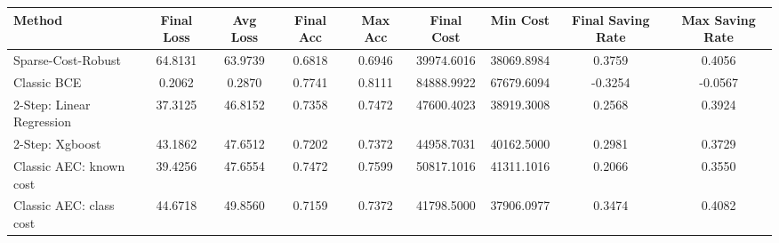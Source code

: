 \begin{tabular}{lcccccccc}
\toprule
Method & Final Loss & Avg Loss & Final Acc & Max Acc & Final Cost & Min Cost & Final Saving Rate & Max Saving Rate \\
\midrule
Sparse-Cost-Robust & 64.8131 & 63.9739 & 0.6818 & 0.6946 & 39974.6016 & 38069.8984 & 0.3759 & 0.4056 \\
Classic BCE & 0.2062 & 0.2870 & 0.7741 & 0.8111 & 84888.9922 & 67679.6094 & -0.3254 & -0.0567 \\
2-Step: Linear Regression & 37.3125 & 46.8152 & 0.7358 & 0.7472 & 47600.4023 & 38919.3008 & 0.2568 & 0.3924 \\
2-Step: Xgboost & 43.1862 & 47.6512 & 0.7202 & 0.7372 & 44958.7031 & 40162.5000 & 0.2981 & 0.3729 \\
Classic AEC: known cost & 39.4256 & 47.6554 & 0.7472 & 0.7599 & 50817.1016 & 41311.1016 & 0.2066 & 0.3550 \\
Classic AEC: class cost & 44.6718 & 49.8560 & 0.7159 & 0.7372 & 41798.5000 & 37906.0977 & 0.3474 & 0.4082 \\
\bottomrule
\end{tabular}
